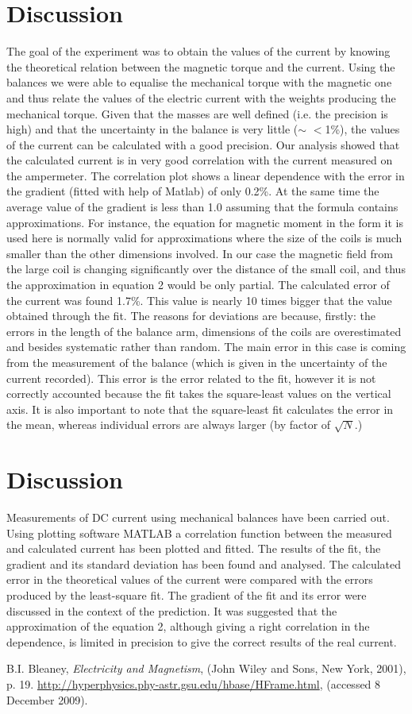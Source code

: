 \documentclass[twocolumn]{article}
\begin{document}
\section{Discussion}
\noindent
The goal of the experiment was to obtain the values of the current by knowing the theoretical relation between the magnetic torque and the current. Using the balances we were able to equalise the mechanical torque with the magnetic one and thus relate the values of the electric
current with the weights producing the mechanical torque. Given that the masses are well defined (i.e. the precision is high) and that the uncertainty in the balance is very little ($\sim$ $<$1\%), the values of the current can be calculated with a good precision. Our analysis showed that the calculated current is in very good correlation with the current measured on the ampermeter. The correlation plot shows a linear dependence with the error in the gradient (fitted with help of Matlab) of only 0.2\%. At the same time the average value of the gradient is less than 1.0 assuming that the formula contains approximations. For instance, the equation for magnetic
moment in the form it is used here is normally valid for approximations where the size of the coils is much smaller than the other dimensions involved. In our case the magnetic field from the large coil is changing significantly over the distance of the small coil, and thus the approximation in equation 2 would be only partial. The calculated error of the current was
found 1.7\%. This value is nearly 10 times bigger that the value obtained through the fit. The reasons for deviations are because, firstly: the errors in the length of the balance arm, dimensions of the coils are overestimated and besides systematic rather than random. The main error in this case is coming from the measurement of the balance (which is given in the uncertainty of the current recorded). This error is the error related to the fit, however it is not correctly accounted because the fit takes the square-least values on the vertical axis. It is also important to note that the square-least fit calculates the error in the mean, whereas individual
errors are always larger (by factor of $\sqrt{N}$.)

\section{Discussion}
\noindent
Measurements of DC current using mechanical balances have been carried out. Using plotting software MATLAB a correlation function between the measured and calculated current has been plotted and fitted. The results of the fit, the gradient and its standard deviation has been
found and analysed. The calculated error in the theoretical values of the current were compared 
with the errors produced by the least-square fit. The gradient of the fit and its error were discussed in the context of the prediction. It was suggested that the approximation of the equation 2, although giving a right correlation in the dependence, is limited in precision to give the correct results of the real current. 

\begin{thebibliography}{9}
 B.I. Bleaney, \emph{Electricity and Magnetism}, (John Wiley and Sons, New York, 2001), p. 19.
 \url{http://hyperphysics.phy-astr.gsu.edu/hbase/HFrame.html}, (accessed  8 December 2009).
\end{thebibliography}
\end{document}
